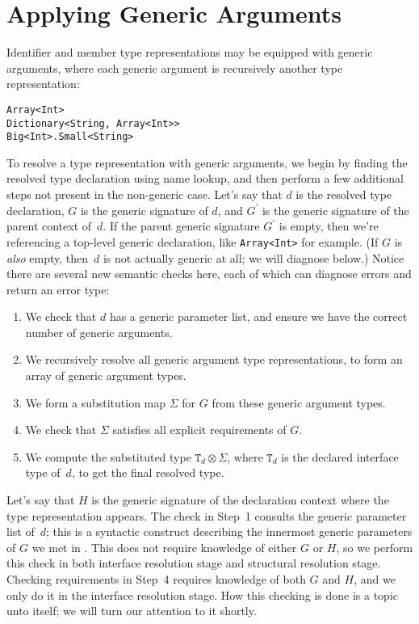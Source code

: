 \documentclass[../generics]{subfiles}
\begin{document}
\section{Applying Generic Arguments}\label{checking generic arguments}

Identifier and member type representations may be equipped with generic arguments, where each generic argument is recursively another type representation:
\begin{Verbatim}
Array<Int>
Dictionary<String, Array<Int>>
Big<Int>.Small<String>
\end{Verbatim}
To resolve a type representation with generic arguments, we begin by finding the resolved type declaration using name lookup, and then perform a few additional steps not present in the non-generic case. Let's say that $d$ is the resolved type declaration, $G$ is the generic signature of $d$, and $G^\prime$ is the generic signature of the parent context of~$d$. If the parent generic signature $G^\prime$ is empty, then we're referencing a top-level generic declaration, like \texttt{Array<Int>} for example. (If $G$ is \emph{also} empty, then~$d$ is not actually generic at all; we will diagnose below.) Notice there are several new semantic checks here, each of which can diagnose errors and return an error type:
\begin{enumerate}
\item We check that $d$ has a generic parameter list, and ensure we have the correct number of generic arguments.
\item We recursively resolve all generic argument type representations, to form an array of generic argument types.
\item We form a substitution map $\Sigma$ for $G$ from these generic argument types.
\item We check that $\Sigma$ satisfies all explicit requirements of $G$.
\item We compute the substituted type $\texttt{T}_d\otimes\Sigma$, where $\texttt{T}_d$ is the declared interface type of~$d$, to get the final resolved type.
\end{enumerate}

Let's say that $H$ is the generic signature of the declaration context where the type representation appears. The check in Step~1 consults the generic parameter list of~$d$; this is a syntactic construct describing the innermost generic parameters of $G$ we met in . This does not require knowledge of either $G$ or $H$, so we perform this check in both interface resolution stage and structural resolution stage. Checking requirements in Step~4 requires knowledge of both $G$ and $H$, and we only do it in the interface resolution stage. How this checking is done is a topic unto itself; we will turn our attention to it shortly.
\end{document}
